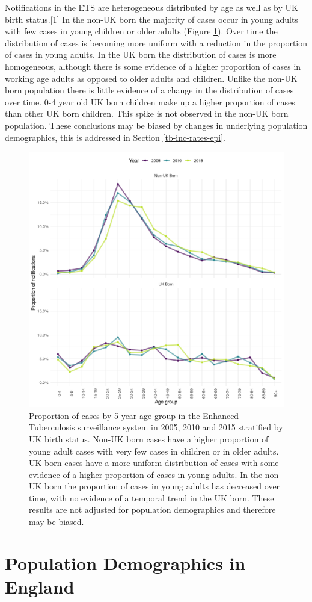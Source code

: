 \documentclass[11pt,twoside]{bristolthesis}
\begin{document}
  Notifications in the ETS are heterogeneous distributed by age as well as by UK birth status.{[}1{]} In the non-UK born the majority of cases occur in young adults with few cases in young children or older adults (Figure \ref{fig:age-dist-cases-nots}). Over time the distribution of cases is becoming more uniform with a reduction in the proportion of cases in young adults. In the UK born the distribution of cases is more homogeneous, although there is some evidence of a higher proportion of cases in working age adults as opposed to older adults and children. Unlike the non-UK born population there is little evidence of a change in the distribution of cases over time. 0-4 year old UK born children make up a higher proportion of cases than other UK born children. This spike is not observed in the non-UK born population. These conclusions may be biased by changes in underlying population demographics, this is addressed in Section \ref{tb-inc-rates-epi}.
  \begin{figure}
  
  {\centering \includegraphics[width=0.8\linewidth]{chapters/tb-epi-england/figures/plot-case-age-dist} 
  
  }
  
  \caption{Proportion of cases by 5 year age group in the Enhanced Tuberculosis surveillance system in 2005, 2010 and 2015 stratified by UK birth status. Non-UK born cases have a higher proportion of young adult cases with very few cases in children or in older adults. UK born cases have a more uniform distribution of cases with some evidence of a higher proportion of cases in young adults. In the non-UK born the proportion of cases in young adults has decreased over time, with no evidence of a temporal trend in the UK born. These results are not adjusted for population demographics and therefore may be biased.}\label{fig:age-dist-cases-nots}
  \end{figure}
  \hypertarget{pop-dist-england}{%
  \section{Population Demographics in England}\label{pop-dist-england}}
  
\end{document}
